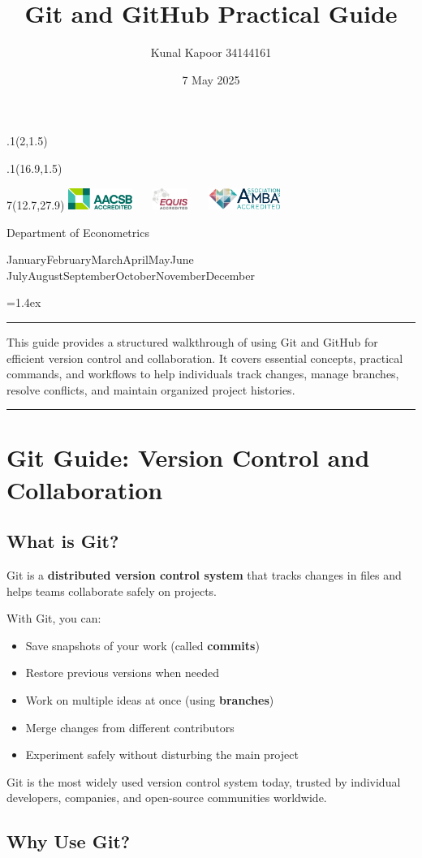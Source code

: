 \documentclass[
  11pt,
  a4paper,
]{article}
\title{Git and GitHub Practical Guide}
\date{7 May 2025}
\author{Kunal Kapoor \textbar{} 34144161}
\makeatletter
\def\placefig#1#2#3#4{\begin{textblock}{.1}(#1,#2)\rlap{\texttt{[image: \#4]}}\end{textblock}}
\def\Month{\ifcase\month\or
 January\or February\or March\or April\or May\or June\or
 July\or August\or September\or October\or November\or December\fi}
\def\Year{\number\year}
\def\cover{{\sffamily\setcounter{page}{0}
        \thispagestyle{empty}
        \placefig{2}{1.5}{width=5cm}{monash2}
        \placefig{16.9}{1.5}{width=2.1cm}{MBSportrait}
        \begin{textblock}{7}(12.7,27.9)\hfill
        \includegraphics[height=0.7cm]{AACSB}~~~
        \includegraphics[height=0.7cm]{EQUIS}~~~
        \includegraphics[height=0.7cm]{AMBA}
        \end{textblock}
        \vspace*{2.5cm}
        \begin{center}\Large
        Department of Econometrics\\[.5cm]
        \end{center}\vspace{2cm}
        \begin{center}
        \fbox{\parbox{14cm}{\begin{onehalfspace}\centering\Huge\vspace*{0.3cm}
                \textsf{\textbf{\expandafter{\@title}}}\vspace{1cm}\par
                \LARGE
                \expandafter{\@author}
                \end{onehalfspace}
        }}
        \end{center}
        \vfill
                \begin{center}\Large
                \Month~\Year\\[1cm]

        \end{center}\vspace*{2cm}}}
\def\titlepage{{\cover}}
\let\maketitle\titlepage
\renewenvironment{abstract}{\begin{minipage}{\textwidth}\parskip=1.4ex\noindent
\hrule\vspace{0.1cm}\par{\sffamily\textbf{\abstractname}}\newline\setstretch{1.5}}
  {\end{minipage}}
\makeatother
\begin{document}
\maketitle

\begin{abstract}
This guide provides a structured walkthrough of using Git and GitHub for
efficient version control and collaboration. It covers essential
concepts, practical commands, and workflows to help individuals track
changes, manage branches, resolve conflicts, and maintain organized
project histories.
\end{abstract}

    \vspace{0.25cm}\par\hrule\vspace{0.5cm}\par
  

\section{Git Guide: Version Control and
Collaboration}\label{git-guide-version-control-and-collaboration}

\subsection{What is Git?}\label{what-is-git}

Git is a \textbf{distributed version control system} that tracks changes
in files and helps teams collaborate safely on projects.

With Git, you can:

\begin{itemize}
\item
  Save snapshots of your work (called \textbf{commits})
\item
  Restore previous versions when needed
\item
  Work on multiple ideas at once (using \textbf{branches})
\item
  Merge changes from different contributors
\item
  Experiment safely without disturbing the main project
\end{itemize}

Git is the most widely used version control system today, trusted by
individual developers, companies, and open-source communities worldwide.

\newpage

\subsection{Why Use Git?}\label{why-use-git}
\end{document}
